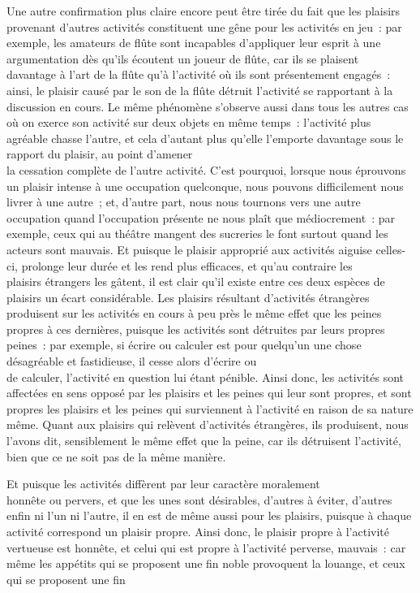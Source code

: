 \documentclass[french,twoside]{book} %
\begin{document}
Une autre confirmation plus claire encore peut être tirée du fait que les plaisirs provenant d’autres activités constituent une gêne pour les activités en jeu : par exemple, les amateurs de flûte sont incapables d’appliquer leur esprit à une argumentation dès qu’ils écoutent un joueur de flûte, car ils se plaisent \\
davantage à l’art de la flûte qu’à l’activité où ils sont présentement engagés : ainsi, le plaisir causé par le son de la flûte détruit l’activité se rapportant à la discussion en cours. Le même phénomène s’observe aussi dans tous les autres cas où on exerce son activité sur deux objets en même temps : l’activité plus agréable chasse l’autre, et cela d’autant plus qu’elle l’emporte davantage sous le rapport du plaisir, au point d’amener \\
la cessation complète de l’autre activité. C’est pourquoi, lorsque nous éprouvons un plaisir intense à une occupation quelconque, nous pouvons difficilement nous livrer à une autre ; et, d’autre part, nous nous tournons vers une autre occupation quand l’occupation présente ne nous plaît que médiocrement : par exemple, ceux qui au théâtre mangent des sucreries le font surtout quand les acteurs sont mauvais. Et puisque le plaisir approprié aux activités aiguise celles-ci, prolonge leur durée et les rend plus efficaces, et qu’au contraire les \\
plaisirs étrangers les gâtent, il est clair qu’il existe entre ces deux espèces de plaisirs un écart considérable. Les plaisirs résultant d’activités étrangères produisent sur les activités en cours à peu près le même effet que les peines propres à ces dernières, puisque les activités sont détruites par leurs propres peines : par exemple, si écrire ou calculer est pour quelqu’un une chose désagréable et fastidieuse, il cesse alors d’écrire ou \\
de calculer, l’activité en question lui étant pénible. Ainsi donc, les activités sont affectées en sens opposé par les plaisirs et les peines qui leur sont propres, et sont propres les plaisirs et les peines qui surviennent à l’activité en raison de sa nature même. Quant aux plaisirs qui relèvent d’activités étrangères, ils produisent, nous l’avons dit, sensiblement le même effet que la peine, car ils détruisent l’activité, bien que ce ne soit pas de la même manière.\par
Et puisque les activités diffèrent par leur caractère moralement \\
honnête ou pervers, et que les unes sont désirables, d’autres à éviter, d’autres enfin ni l’un ni l’autre, il en est de même aussi pour les plaisirs, puisque à chaque activité correspond un plaisir propre. Ainsi donc, le plaisir propre à l’activité vertueuse est honnête, et celui qui est propre à l’activité perverse, mauvais : car même les appétits qui se proposent une fin noble provoquent la louange, et ceux qui se proposent une fin \\
\end{document}
